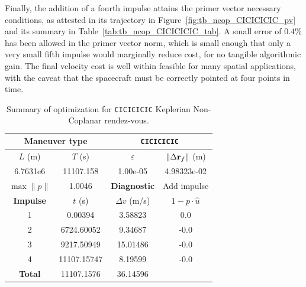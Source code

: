 Finally, the addition of a fourth impulse attains the primer vector necessary conditions, as attested in its trajectory in Figure~\ref{fig:tb_ncop_CICICICIC_pv} and its summary in Table~\ref{tab:tb_ncop_CICICICIC_tab}. A small error of \(0.4\%\) has been allowed in the primer vector norm, which is small enough that only a very small fifth impulse would marginally reduce cost, for no tangible algorithmic gain. The final velocity cost is well within feasible for many spatial applications, with the caveat that the spacecraft must be correctly pointed at four points in time. 

\begin{table}[htpb]
    \centering
    \begin{tabular}{cccc} \toprule
    \multicolumn{2}{c}{\textbf{Maneuver type}} & \multicolumn{2}{c}{\texttt{CICICICIC}} \\ \midrule
    \(L\) (m) & \(T\) (s) & \(\varepsilon\) & \(\lVert \Delta \mathbf{r}_{f} \rVert\) (m)    \\ \midrule
    6.7631e6          & 11107.158          & 1.00e-05                & 4.98323e-02                        \\ \midrule
    \(\max \lVert p \rVert\) & 1.0046     & \textbf{Diagnostic}   & Add impulse        \\ \midrule
    \textbf{Impulse} & \(t\) (s) & \(\Delta v\) (m/s) & \(1 - p \cdot \hat{u}\) \\ \midrule
    1                 & 0.00394          & 3.58823             & 0.0                    \\
    2                 & 6724.60052          & 9.34687             & -0.0                    \\
    3                 & 9217.50949          & 15.01486             & -0.0                    \\
    4                 & 11107.15747          & 8.19599             & -0.0                    \\\midrule
    \textbf{Total}   & 11107.1576          & 36.14596             &                     \\ \bottomrule   
    \end{tabular}
    \caption{Summary of optimization for \texttt{CICICICIC} Keplerian Non-Coplanar rendez-vous.}
    \label{tab:tb_nr_CICICICIC_tab}
\end{table}

